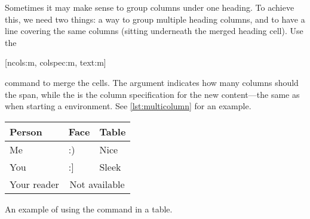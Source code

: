 Sometimes it may make sense to group columns under one heading. To achieve this,
we need two things: a way to group multiple heading columns, and to have a line
covering the same columns (sitting underneath the merged heading cell). Use the
\begin{lscommand}
  [ncols:m, colspec:m, text:m]
\end{lscommand}
command to merge the cells. The  argument indicates how many
columns should the  span, while the  is the column
specification for the new content---the same as when starting a 
environment. See \autoref{lst:multicolumn} for an example.
\begin{listing}
  \begin{chktexignore}
  \begin{example}[examplewidth=0.8\linewidth, vertical_mode]
\begin{tabular}{@{}lll@{}}
  \toprule
  Person      & Face & Table                      \\
  \midrule
  Me          & :)   & Nice                       \\
  You         & :]   & Sleek                      \\
  Your reader & \multicolumn{2}{c}{Not available} \\
  \bottomrule
\end{tabular}
\end{example}
\end{chktexignore}
  \caption{An example of using the  command in a table.}\label{lst:multicolumn}
\end{listing}

